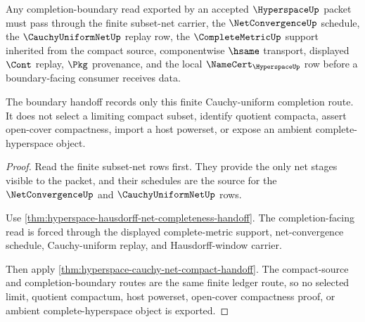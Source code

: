 \begin{theorem}
\label{thm:hyperspace-completion-boundary-obligations}
Any completion-boundary read exported by an accepted $\HyperspaceUp$ packet must pass through the finite subset-net carrier, the $\NetConvergenceUp$ schedule, the $\CauchyUniformNetUp$ replay row, the $\CompleteMetricUp$ support inherited from the compact source, componentwise $\hsame$ transport, displayed $\Cont$ replay, $\Pkg$ provenance, and the local $\NameCert_{\HyperspaceUp}$ row before a boundary-facing consumer receives data.

The boundary handoff records only this finite Cauchy-uniform completion route. It does not select a limiting compact subset, identify quotient compacta, assert open-cover compactness, import a host powerset, or expose an ambient complete-hyperspace object.
\end{theorem}
\begin{proof}
Read the finite subset-net rows first. They provide the only net stages visible to the packet, and their schedules are the source for the $\NetConvergenceUp$ and $\CauchyUniformNetUp$ rows.

Use \autoref{thm:hyperspace-hausdorff-net-completeness-handoff}. The completion-facing read is forced through the displayed complete-metric support, net-convergence schedule, Cauchy-uniform replay, and Hausdorff-window carrier.

Then apply \autoref{thm:hyperspace-cauchy-net-compact-handoff}. The compact-source and completion-boundary routes are the same finite ledger route, so no selected limit, quotient compactum, host powerset, open-cover compactness proof, or ambient complete-hyperspace object is exported.
\end{proof}

